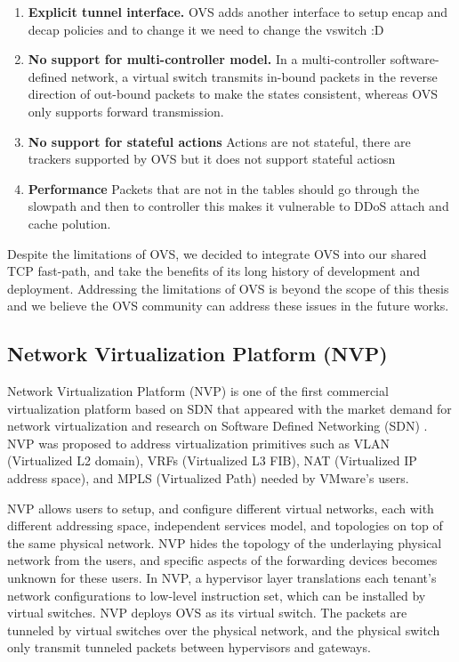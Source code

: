 \begin{enumerate}
    \item \textbf{Explicit tunnel interface.} OVS adds another interface to setup encap and 
    decap policies and to change it we need to change the vswitch :D %

    \item \textbf{No support for multi-controller model.} In a multi-controller 
    software-defined network, a virtual switch transmits in-bound packets in the reverse 
    direction of out-bound packets to make the states consistent, whereas OVS only supports forward transmission. 

    \item \textbf{No support for stateful actions} Actions are not stateful, there are 
    trackers supported by OVS but it does not support stateful actiosn %

    \item \textbf{Performance} Packets that are not in the tables should go through the 
    slowpath and then to controller this makes it vulnerable to DDoS attach and cache 
    polution.  %

\end{enumerate}

Despite the limitations of OVS, we decided to integrate OVS into our shared TCP fast-path,
and take the benefits of its long history of development and deployment. Addressing 
the limitations of OVS is beyond the scope of this thesis and we believe the OVS community can
address these issues in the future works. 

\subsection{Network Virtualization Platform (NVP)}
\label{nvp}
Network Virtualization Platform (NVP) is one of the first commercial virtualization 
platform based on SDN that appeared with the market demand for network virtualization
and research on Software Defined Networking (SDN) \cite{koponen2014network}. NVP was proposed 
to address virtualization primitives such as VLAN (Virtualized L2 domain), 
VRFs (Virtualized L3 FIB), NAT 
(Virtualized IP address space), and MPLS (Virtualized Path) needed by VMware's users.

NVP allows users to setup, and configure different virtual networks, each with
different addressing space, independent services model, and topologies
on top of the same physical network. NVP hides the topology of  the underlaying physical network
from the users, and specific aspects of the forwarding devices becomes unknown for these users. 
In NVP, a hypervisor layer translations each tenant's network configurations to 
low-level instruction set, which can be installed by virtual switches. NVP deploys OVS
as its virtual switch. The packets are tunneled by virtual switches over the physical network, and 
the physical switch only transmit tunneled packets between hypervisors and gateways.

